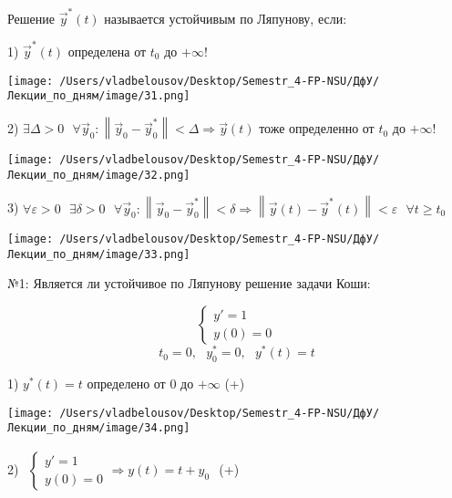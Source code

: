 \documentclass[12pt, a4paper]{report}
\begin{document}
\begin{definition}
    Решение \( \vec{y } ^*(t )   \) называется устойчивым по Ляпунову, если: 

    1) \( \vec{y } ^* (t ) \) определена от \( t_0  \) до \( +\infty  \)!

    \begin{center}
        \texttt{[image: /Users/vladbelousov/Desktop/Semestr\_4-FP-NSU/ДфУ/Лекции\_по\_дням/image/31.png]}
    \end{center}

    2) \( \exists \Delta > 0 \text{ }  \forall  \vec{y} _0 :   \left\lVert \vec{y } _ 0 - \vec{y } _0 ^*  \right\rVert< \Delta \Rightarrow \vec{y } (t )  \) тоже определенно от \( t_0  \) до \( +\infty  \)!

    \begin{center}
        \texttt{[image: /Users/vladbelousov/Desktop/Semestr\_4-FP-NSU/ДфУ/Лекции\_по\_дням/image/32.png]}
    \end{center}

    3) \( \forall  \varepsilon > 0 \text{ }  \exists  \delta > 0 \text{ }  \forall  \vec{y } _ 0 : \left\lVert  \vec{y } _0 - \vec{y }  ^ * _0  \right\rVert < \delta \Rightarrow \left\lVert  \vec{y }  (t ) - \vec{y }  ^*    (t ) \right\rVert < \varepsilon \text{ }  \forall  t \ge t_0 \) 

    \begin{center}
        \texttt{[image: /Users/vladbelousov/Desktop/Semestr\_4-FP-NSU/ДфУ/Лекции\_по\_дням/image/33.png]}
    \end{center}
\end{definition}

№1: Является ли устойчивое по Ляпунову решение задачи Коши: 

\[ \begin{cases}
y ' = 1 \\ 
y(0) = 0
\end{cases} \] 
\[ t_0 = 0, \text{ }  y^{* }  _0 = 0 , \text{ }  y^* (t )  = t \] 

1) \( y^* (t ) =t   \) определено от \( 0 \)  до \( + \infty  \)  (+)

\begin{center}
    \texttt{[image: /Users/vladbelousov/Desktop/Semestr\_4-FP-NSU/ДфУ/Лекции\_по\_дням/image/34.png]}
\end{center}

2) \( \begin{aligned}
    \begin{cases}
        y' = 1 \\ 
        y(0 )= 0 
    \end{cases}
    \Rightarrow y(t ) = t+ y_0
\end{aligned} \) (+)
\end{document}
